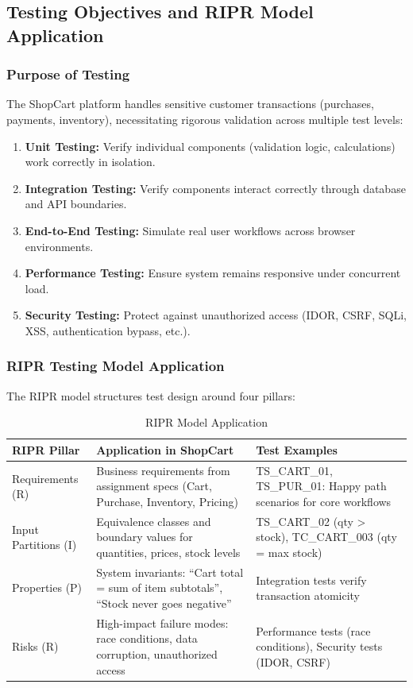 \documentclass[11pt,a4paper]{article}
\begin{document}
\subsection{Testing Objectives and RIPR Model Application}

\subsubsection{Purpose of Testing}

The ShopCart platform handles sensitive customer transactions (purchases, payments, inventory), necessitating rigorous validation across multiple test levels:

\begin{enumerate}
    \item \textbf{Unit Testing:} Verify individual components (validation logic, calculations) work correctly in isolation.
    \item \textbf{Integration Testing:} Verify components interact correctly through database and API boundaries.
    \item \textbf{End-to-End Testing:} Simulate real user workflows across browser environments.
    \item \textbf{Performance Testing:} Ensure system remains responsive under concurrent load.
    \item \textbf{Security Testing:} Protect against unauthorized access (IDOR, CSRF, SQLi, XSS, authentication bypass, etc.).
\end{enumerate}

\subsubsection{RIPR Testing Model Application}

The RIPR model structures test design around four pillars:

\begin{table}[H]
\centering
\small
\begin{tabularx}{\textwidth}{|l|X|X|}
\hline
\textbf{RIPR Pillar} & \textbf{Application in ShopCart} & \textbf{Test Examples} \\
\hline
Requirements (R) & Business requirements from assignment specs (Cart, Purchase, Inventory, Pricing) & TS\_CART\_01, TS\_PUR\_01: Happy path scenarios for core workflows \\
\hline
Input Partitions (I) & Equivalence classes and boundary values for quantities, prices, stock levels & TS\_CART\_02 (qty > stock), TC\_CART\_003 (qty = max stock) \\
\hline
Properties (P) & System invariants: ``Cart total = sum of item subtotals'', ``Stock never goes negative'' & Integration tests verify transaction atomicity \\
\hline
Risks (R) & High-impact failure modes: race conditions, data corruption, unauthorized access & Performance tests (race conditions), Security tests (IDOR, CSRF) \\
\hline
\end{tabularx}
\caption{RIPR Model Application}
\end{table}
\end{document}
